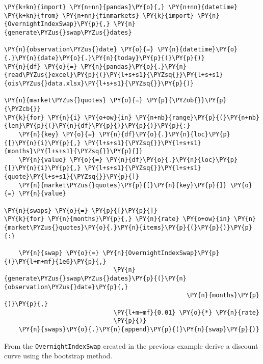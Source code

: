 \begin{Answer}
\begin{codebox}[size=fbox, boxrule=1pt, colback=cellbackground, colframe=cellborder]
\begin{Verbatim}[commandchars=\\\{\}]
\PY{k+kn}{import} \PY{n+nn}{pandas}\PY{o}{,} \PY{n+nn}{datetime}
\PY{k+kn}{from} \PY{n+nn}{finmarkets} \PY{k}{import} \PY{n}{OvernightIndexSwap}\PY{p}{,} \PY{n}{generate\PYZus{}swap\PYZus{}dates}

\PY{n}{observation\PYZus{}date} \PY{o}{=} \PY{n}{datetime}\PY{o}{.}\PY{n}{date}\PY{o}{.}\PY{n}{today}\PY{p}{(}\PY{p}{)}
\PY{n}{df} \PY{o}{=} \PY{n}{pandas}\PY{o}{.}\PY{n}{read\PYZus{}excel}\PY{p}{(}\PY{l+s+s1}{\PYZsq{}}\PY{l+s+s1}{ois\PYZus{}data.xlsx}\PY{l+s+s1}{\PYZsq{}}\PY{p}{)}

\PY{n}{market\PYZus{}quotes} \PY{o}{=} \PY{p}{\PYZob{}}\PY{p}{\PYZcb{}}
\PY{k}{for} \PY{n}{i} \PY{o+ow}{in} \PY{n+nb}{range}\PY{p}{(}\PY{n+nb}{len}\PY{p}{(}\PY{n}{df}\PY{p}{)}\PY{p}{)}\PY{p}{:}
    \PY{n}{key} \PY{o}{=} \PY{n}{df}\PY{o}{.}\PY{n}{loc}\PY{p}{[}\PY{n}{i}\PY{p}{,} \PY{l+s+s1}{\PYZsq{}}\PY{l+s+s1}{months}\PY{l+s+s1}{\PYZsq{}}\PY{p}{]}
    \PY{n}{value} \PY{o}{=} \PY{n}{df}\PY{o}{.}\PY{n}{loc}\PY{p}{[}\PY{n}{i}\PY{p}{,} \PY{l+s+s1}{\PYZsq{}}\PY{l+s+s1}{quote}\PY{l+s+s1}{\PYZsq{}}\PY{p}{]}
    \PY{n}{market\PYZus{}quotes}\PY{p}{[}\PY{n}{key}\PY{p}{]} \PY{o}{=} \PY{n}{value}

\PY{n}{swaps} \PY{o}{=} \PY{p}{[}\PY{p}{]}
\PY{k}{for} \PY{n}{months}\PY{p}{,} \PY{n}{rate} \PY{o+ow}{in} \PY{n}{market\PYZus{}quotes}\PY{o}{.}\PY{n}{items}\PY{p}{(}\PY{p}{)}\PY{p}{:}
        
    \PY{n}{swap} \PY{o}{=} \PY{n}{OvernightIndexSwap}\PY{p}{(}\PY{l+m+mf}{1e6}\PY{p}{,}
                              \PY{n}{generate\PYZus{}swap\PYZus{}dates}\PY{p}{(}\PY{n}{observation\PYZus{}date}\PY{p}{,}
                                                  \PY{n}{months}\PY{p}{)}\PY{p}{,}
                              \PY{l+m+mf}{0.01} \PY{o}{*} \PY{n}{rate}
                              \PY{p}{)}
    \PY{n}{swaps}\PY{o}{.}\PY{n}{append}\PY{p}{(}\PY{n}{swap}\PY{p}{)}
\end{Verbatim}
\end{codebox}
\end{Answer}

\begin{Exercise}[title={(Bootstrapping of Discount Curve)}]
From the \texttt{OvernightIndexSwap} created in the previous example derive a discount curve using the bootstrap method.
\end{Exercise}

